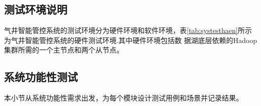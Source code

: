 \subsection{测试环境说明}
气井智能管控系统的测试环境分为硬件环境和软件环境，表\ref{tab:systesthaen}所示为气井智能管控系统的硬件测试环境.其中硬件环境包括数
据湖底层依赖的Hadoop 集群所需的一个主节点和两个从节点。
\subsection{系统功能性测试}
本小节从系统功能性需求出发，为每个模块设计测试用例和场景并记录结果。

